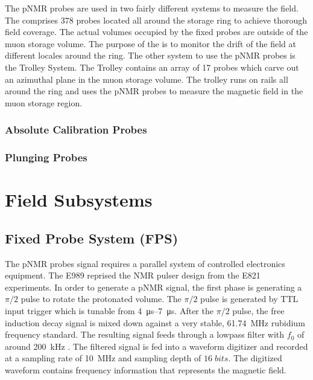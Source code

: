 The pNMR probes are used in two fairly different systems to measure the field.  The \fps comprises 378 probes located all around the storage ring to achieve thorough field coverage.  The actual volumes occupied by the fixed probes are outside of the muon storage volume.  The purpose of the \fps is to monitor the drift of the field at different locales around the ring.  The other system to use the pNMR probes is the Trolley System. The Trolley contains an array of 17 probes which carve out an azimuthal plane in the muon storage volume.  The trolley runs on rails all around the ring and uses the pNMR probes to measure the magnetic field in the muon storage region.  

\subsubsection{Absolute Calibration Probes}


\subsubsection{Plunging Probes}


\section{Field Subsystems}

\subsection{Fixed Probe System (FPS)}

The pNMR probes signal requires a parallel system of controlled electronics equipment.  The E989 reprised the NMR pulser design from the E821 experiments.  In order to generate a pNMR signal, the first phase is generating a $\pi/2$ pulse to rotate the protonated volume.  The $\pi/2$ pulse is generated by TTL input trigger which is tunable from \SIrange{4}{7}{\micro\second}.  After the $\pi/2$ pulse, the free induction decay signal is mixed down against a very stable, \SI{61.74}{\MHz} rubidium frequency standard.  The resulting signal feeds through a lowpass filter with $f_0$ of around \SI{200}{\kHz} .  The filtered signal is fed into a waveform digitizer and recorded at a sampling rate of \SI{10}{\MHz} and sampling depth of $16\;bits$.  The digitized waveform contains frequency information that represents the magnetic field.


